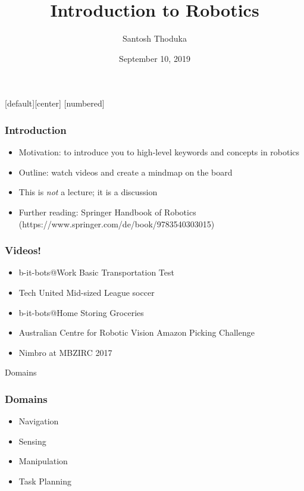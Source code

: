 \documentclass{beamer}
\title[]{Introduction to Robotics}
\author[Santosh Thoduka]{Santosh Thoduka}
\institute[HBRS]{Hochschule Bonn Rhein Sieg}
\date{September 10, 2019}
\begin{document}
[default][center]
[numbered]
\captionsetup[subfigure]{labelformat=empty}

\begin{frame}[plain]
\addtocounter{framenumber}{-1}
\maketitle
\end{frame}

\begin{frame}
\frametitle{Introduction}
\begin{itemize}
    \item Motivation: to introduce you to high-level keywords and concepts in robotics
    \item Outline: watch videos and create a mindmap on the board
    \item This is \emph{not} a lecture; it is a discussion
    \item Further reading: Springer Handbook of Robotics (https://www.springer.com/de/book/9783540303015)
\end{itemize}

\end{frame}

\begin{frame}
\frametitle{Videos!}
\begin{itemize}
\item <1-> b-it-bots@Work Basic Transportation Test
\item <2-> Tech United Mid-sized League soccer
\item <3-> b-it-bots@Home Storing Groceries
\item <4-> Australian Centre for Robotic Vision Amazon Picking Challenge
\item <5-> Nimbro at MBZIRC 2017
\end{itemize}

\end{frame}

\begin{frame}[standout]
     Domains
\end{frame}

\begin{frame}
\frametitle{Domains}
\begin{itemize}
    \item Navigation
    \item Sensing
    \item Manipulation
    \item Task Planning
\end{itemize}
\end{frame}
\end{document}
